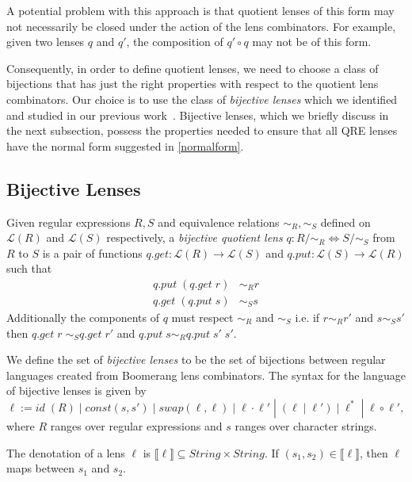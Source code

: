 \documentclass{svproc}
\newcommand{\sep}{\ensuremath{\; | \;}}
\begin{document}
A potential problem with this approach is that quotient lenses of this form may
not necessarily be closed under the action of the lens combinators. For
example, given two lenses $q$ and $q'$, the composition of $q' \circ q$ may not
be of this form.

Consequently, in order to define quotient lenses, we need to choose a class of
bijections that has just the right properties with respect to the quotient
lens combinators. Our choice is to use the class of \textit{bijective
  lenses} which we identified and studied in our previous work~\cite{popl18}.
Bijective lenses, which we briefly discuss in the next subsection, possess
the properties needed to ensure that all QRE lenses have the normal form
suggested in \cref{normalform}.

\subsection{Bijective Lenses}
Given regular expressions $R, S$ and equivalence
relations $\sim_R, \sim_S$ defined on $\mathcal{L}(R)$ and $\mathcal{L}(S)$
respectively, a \textit{bijective quotient lens} $q :
R/{\sim_R}{\Longleftrightarrow} S/{\sim_S}$ from $R$ to $S$ is
a pair of functions $q.get:
\mathcal{L}(R) \longrightarrow \mathcal{L}(S)$ and $q.put : \mathcal{L}(S)
\longrightarrow \mathcal{L}(R)$ such that
\begin{align*}
  q.put \; (q.get \; r) &\sim_R r\\
  q.get \; (q.put \; s) &\sim_S s
\end{align*}
Additionally the components of $q$ must respect $\sim_R$ and $\sim_S$ i.e.
if $r \sim_R r'$ and $s \sim_S s'$ then $q.get \; r \; \sim_S q.get \; r'$
and $q.put \; s \sim_R q.put \; s' \; s'$.

We define the set of \textit{bijective lenses} to be the set of bijections
between regular languages created from Boomerang lens combinators.
The syntax for the language of bijective lenses is given by
$$\ell := \mathit{id} \; (R) \sep const(s, s') \sep  swap(\ell,
\ell) \sep \ell \cdot \ell' \; |  \; (\ell \sep \ell') \sep \ell^* \;
| \; \ell \circ \ell',$$ where $R$ ranges over regular expressions and $s$
ranges over character strings.

The denotation of a lens $\ell$ is $\llbracket \ell \rrbracket \subseteq
\mathit{String} \times \mathit{String}$. If $(s_1, s_2) \in \llbracket \ell
\rrbracket$, then $\ell$ maps between $s_1$ and $s_2$.
\end{document}
